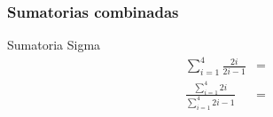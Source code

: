 \documentclass[12pt,spanish,x11names]{beamer}
\begin{document}
\begin{frame}
  \frametitle{Sumatorias combinadas}
  \begin{block}{Sumatoria Sigma}
    \begin{eqnarray}
      \sum_{i=1}^{4}\frac{2i}{2i-1}&=&\\
      \frac{\sum_{i=1}^{4}2i}{\sum_{i=1}^{4}2i-1}&=&
    \end{eqnarray}
  \end{block}
\end{frame}
\end{document}
